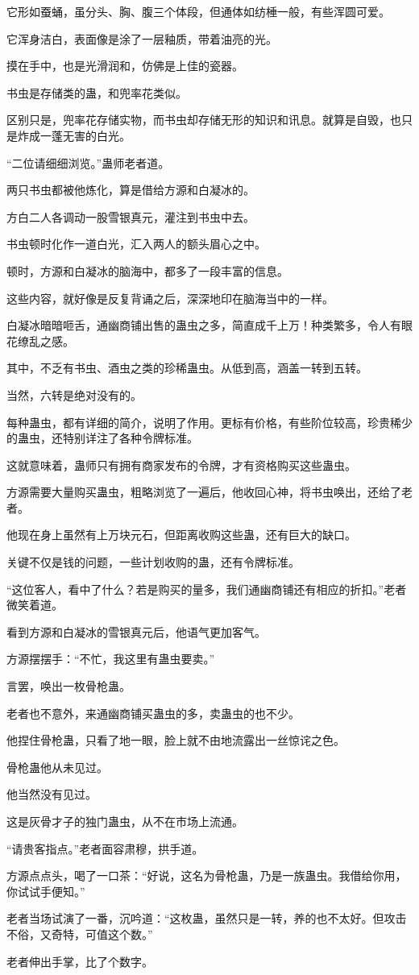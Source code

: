 \begin{this_body}
它形如蚕蛹，虽分头、胸、腹三个体段，但通体如纺棰一般，有些浑圆可爱。

它浑身洁白，表面像是涂了一层釉质，带着油亮的光。

摸在手中，也是光滑润和，仿佛是上佳的瓷器。

书虫是存储类的蛊，和兜率花类似。

区别只是，兜率花存储实物，而书虫却存储无形的知识和讯息。就算是自毁，也只是炸成一蓬无害的白光。

“二位请细细浏览。”蛊师老者道。

两只书虫都被他炼化，算是借给方源和白凝冰的。

方白二人各调动一股雪银真元，灌注到书虫中去。

书虫顿时化作一道白光，汇入两人的额头眉心之中。

顿时，方源和白凝冰的脑海中，都多了一段丰富的信息。

这些内容，就好像是反复背诵之后，深深地印在脑海当中的一样。

白凝冰暗暗咂舌，通幽商铺出售的蛊虫之多，简直成千上万！种类繁多，令人有眼花缭乱之感。

其中，不乏有书虫、酒虫之类的珍稀蛊虫。从低到高，涵盖一转到五转。

当然，六转是绝对没有的。

每种蛊虫，都有详细的简介，说明了作用。更标有价格，有些阶位较高，珍贵稀少的蛊虫，还特别详注了各种令牌标准。

这就意味着，蛊师只有拥有商家发布的令牌，才有资格购买这些蛊虫。

方源需要大量购买蛊虫，粗略浏览了一遍后，他收回心神，将书虫唤出，还给了老者。

他现在身上虽然有上万块元石，但距离收购这些蛊，还有巨大的缺口。

关键不仅是钱的问题，一些计划收购的蛊，还有令牌标准。

“这位客人，看中了什么？若是购买的量多，我们通幽商铺还有相应的折扣。”老者微笑着道。

看到方源和白凝冰的雪银真元后，他语气更加客气。

方源摆摆手：“不忙，我这里有蛊虫要卖。”

言罢，唤出一枚骨枪蛊。

老者也不意外，来通幽商铺买蛊虫的多，卖蛊虫的也不少。

他捏住骨枪蛊，只看了地一眼，脸上就不由地流露出一丝惊诧之色。

骨枪蛊他从未见过。

他当然没有见过。

这是灰骨才子的独门蛊虫，从不在市场上流通。

“请贵客指点。”老者面容肃穆，拱手道。

方源点点头，喝了一口茶：“好说，这名为骨枪蛊，乃是一族蛊虫。我借给你用，你试试手便知。”

老者当场试演了一番，沉吟道：“这枚蛊，虽然只是一转，养的也不太好。但攻击不俗，又奇特，可值这个数。”

老者伸出手掌，比了个数字。

\end{this_body}

